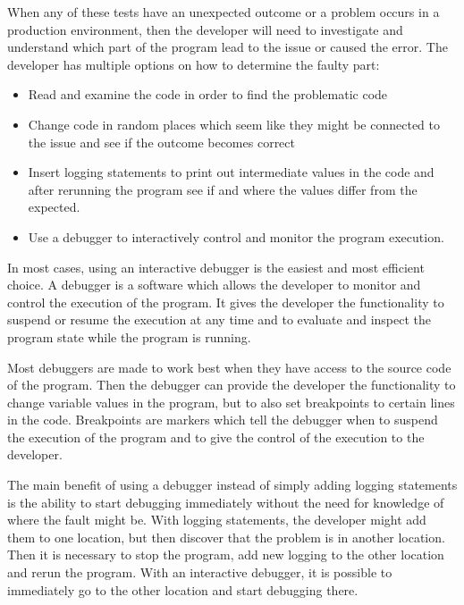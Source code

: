 \documentclass[..thesis.tex]{subfiles}
\begin{document}
When any of these tests have an unexpected outcome or a problem occurs in a production environment, then the developer will need to investigate and understand which part of the program lead to the issue or caused the error.
The developer has multiple options on how to determine the faulty part:
\begin{itemize}
  \item Read and examine the code in order to find the problematic code
  \item Change code in random places which seem like they might be connected to the issue and see if the outcome becomes correct
  \item Insert logging statements to print out intermediate values in the code and after rerunning the program see if and where the values differ from the expected.
  \item Use a debugger to interactively control and monitor the program execution.
\end{itemize}

In most cases, using an interactive debugger is the easiest and most efficient choice. 
A debugger is a software which allows the developer to monitor and control the execution of the program.
It gives the developer the functionality to suspend or resume the execution at any time and to evaluate and inspect the program state while the program is running. 

Most debuggers are made to work best when they have access to the source code of the program. 
Then the debugger can provide the developer the functionality to change variable values in the program, but to also set breakpoints to certain lines in the code. 
Breakpoints are markers which tell the debugger when to suspend the execution of the program and to give the control of the execution to the developer.

The main benefit of using a debugger instead of simply adding logging statements is the ability to start debugging immediately without the need for knowledge of where the fault might be.
With logging statements, the developer might add them to one location, but then discover that the problem is in another location. 
Then it is necessary to stop the program, add new logging to the other location and rerun the program.
With an interactive debugger, it is possible to immediately go to the other location and start debugging there.
\end{document}
